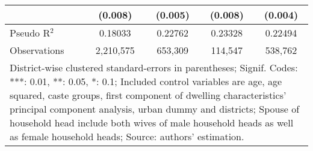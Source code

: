 \begin{table}[htb]
\begin{tabular}{lcccc}
   						 & (0.008)                 & (0.005)                 & (0.008)				   & (0.004) \\ 
     \midrule
   Pseudo R$^2$          & 0.18033                 & 0.22762                 & 0.23328				   & 0.22494 \\ 
   Observations          & 2,210,575               & 653,309                 & 114,547				   & 538,762 \\  
   \midrule
   \midrule
   \multicolumn{5}{p{15.2cm}}{\footnotesize{ District-wise clustered standard-errors in parentheses; Signif. Codes: ***: 0.01, **: 0.05, *: 0.1; Included control variables are age, age squared, caste groups, first component of dwelling characteristics' principal component analysis, urban dummy and districts; Spouse of household head include both wives of male household heads as well as female household heads; Source: authors' estimation.}}\\
\end{tabular}%
\label{tab:logitGenderedEngagementsInJobs}
\end{table}


